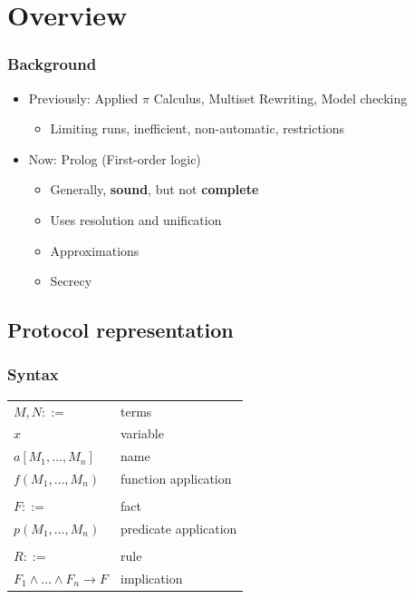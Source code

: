 \documentclass[10pt]{beamer}
\begin{document}
\section{Overview}

\begin{frame}
  \frametitle{Background}
  \begin{itemize}
    \item Previously: Applied $\pi$ Calculus, Multiset Rewriting, Model checking
    \begin{itemize}
      \item Limiting runs, inefficient, non-automatic, restrictions
    \end{itemize}
    \item Now: Prolog (First-order logic)
    \begin{itemize}
      \item Generally, \textbf{sound}, but not \textbf{complete}
      \item Uses resolution and unification
      \item Approximations
      \item Secrecy
    \end{itemize}
  \end{itemize}
\end{frame}

\subsection{Protocol representation}

\newcommand{\mytab}{\hspace{0.05\textwidth}}

\begin{frame}
  \frametitle{Syntax}
  \centering

  {\setlength{\tabcolsep}{20pt}
    \begin{tabular}{ll}
      $M, N ::=$ & terms \\
      \mytab$x$ & \mytab variable \\
      \mytab$a[M_1, \dots, M_n]$ & \mytab name \\
      \mytab$f(M_1, \dots, M_n)$ & \mytab function application \\\\

      $F ::=$ & fact \\
      \mytab$p(M_1, \dots, M_n)$ & \mytab predicate application \\\\

      $R ::=$ & rule \\
      \mytab$F_1 \land \dots \land F_n \rightarrow F$ & \mytab implication
    \end{tabular}
  }
\end{frame}
\end{document}
